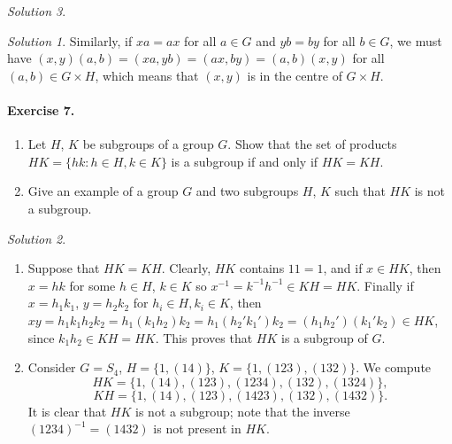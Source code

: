 \documentclass[11pt]{report}
\theoremstyle{remark}
\newtheorem*{solution}{Solution}
\begin{document}
\begin{solution}
\begin{solution}
        Similarly, if $xa = ax$ for all $a \in G$ and $yb = by$ for all $b \in G$,
        we must have $(x, y)(a, b) = (xa, yb) = (ax, by) = (a, b)(x, y)$ for all
        $(a, b) \in G\times H$, which means that $(x, y)$ is in the centre of
        $G\times H$.
    \end{solution}
    
    \paragraph{Exercise 7.} \mbox{}
    \begin{enumerate}
        \itemsep0em
        \item Let $H$, $K$ be subgroups of a group $G$. Show that the set of
        products $HK = \{hk: h \in H, k \in K\}$ is a subgroup if and only if $HK =
        KH$.
        \item Give an example of a group $G$ and two subgroups $H$, $K$ such that
        $HK$ is not a subgroup.
    \end{enumerate}
    \begin{solution} \mbox{}
    \begin{enumerate}
        \item Suppose that $HK = KH$. Clearly, $HK$ contains $1 1 = 1$, and if $x
        \in HK$, then $x = hk$ for some $h\in H$, $k \in K$ so $x^{-1} =
        k^{-1}h^{-1} \in KH = HK$. Finally if $x = h_1k_1$, $y = h_2k_2$ for $h_i
        \in H, k_i \in K$, then $xy = h_1k_1h_2k_2 = h_1(k_1h_2)k_2 =
        h_1(h_2'k_1')k_2 = (h_1h_2')(k_1'k_2) \in HK$, since $k_1h_2 \in KH = HK$.
        This proves that $HK$ is a subgroup of $G$.

        \item Consider $G = S_4$, $H = \{1, (14)\}$, $K = \{1, (123), (132)\}$. We
        compute \[
            HK = \{1, (14), (123), (1234), (132), (1324)\},
        \] \[
            KH = \{1, (14), (123), (1423), (132), (1432)\}.
        \] It is clear that $HK$ is not a subgroup; note that the inverse
        $(1234)^{-1} = (1432)$ is not present in $HK$.
    \end{enumerate}
    \end{solution}


\end{solution}
\end{document}
